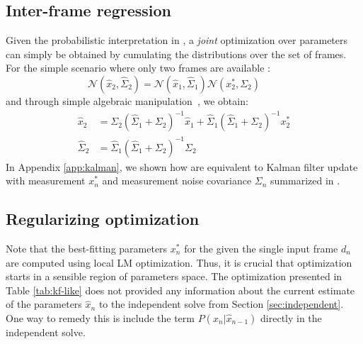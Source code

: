 \subsection{Inter-frame regression } 
\label{sec:combining}
Given the probabilistic interpretation in , a \emph{joint} optimization over parameters can simply be obtained by cumulating the distributions over the set of frames. For the simple scenario where only two frames are available :
% 
\begin{equation}
\mathcal{N}(\hat{x}_2, \hat{\Sigma}_2) = \mathcal{N}(\hat{x}_1, \hat{\Sigma}_1) \mathcal{N}(x_2^*, \Sigma_2) \quad\quad
\end{equation}
and through simple algebraic manipulation~\cite{petersen2008matrix}, we obtain:
\begin{align}
\hat{x}_2 &= \Sigma_2 (\hat{\Sigma}_1 + \Sigma_2)^{-1} \hat{x}_1 + 
\hat{\Sigma}_1 (\hat{\Sigma}_1 + \Sigma_2)^{-1} x_2^*
\\
\hat{\Sigma}_2 &= \hat{\Sigma}_1 (\hat{\Sigma}_1 + \Sigma_2)^{-1} \Sigma_2
\label{eq:combining}
\end{align}
In Appendix \ref{app:kalman}, we shown how  are equivalent to Kalman filter update with measurement $x_n^*$ and measurement noise covariance $\Sigma_n$ summarized in .



\subsection{Regularizing optimization}

Note that the best-fitting parameters $x_n^*$ for the given the single input frame $d_n$ are computed using local LM optimization. Thus, it is crucial that optimization starts in a sensible region of parameters space. The optimization presented in Table \ref{tab:kf-like} does not provided any information about the current estimate of the parameters $\hat{x}_n$ to the independent solve from Section \ref{sec:independent}. One way to remedy this is include the term $P(x_n |\hat{x}_{n - 1})$ directly in the independent solve.

